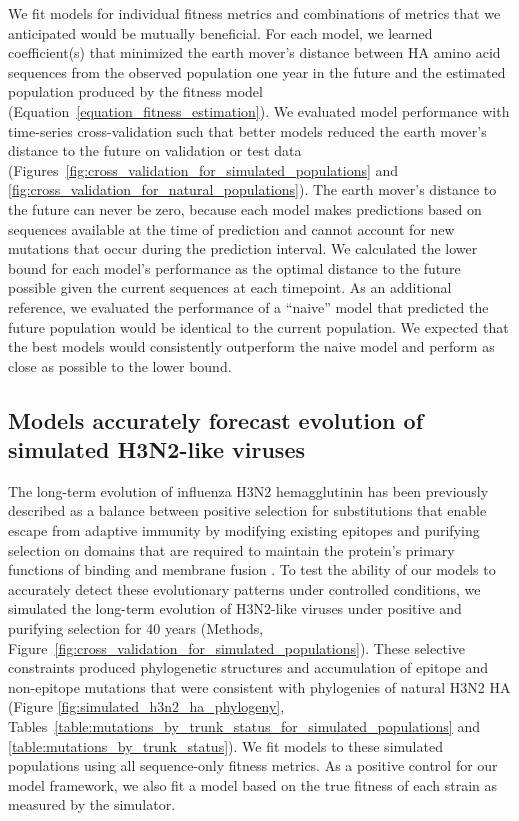 We fit models for individual fitness metrics and combinations of metrics that we anticipated would be mutually beneficial.
For each model, we learned coefficient(s) that minimized the earth mover's distance between HA amino acid sequences from the observed population one year in the future and the estimated population produced by the fitness model (Equation~\ref{equation_fitness_estimation}).
We evaluated model performance with time-series cross-validation such that better models reduced the earth mover's distance to the future on validation or test data (Figures~\ref{fig:cross_validation_for_simulated_populations} and \ref{fig:cross_validation_for_natural_populations}).
The earth mover's distance to the future can never be zero, because each model makes predictions based on sequences available at the time of prediction and cannot account for new mutations that occur during the prediction interval.
We calculated the lower bound for each model's performance as the optimal distance to the future possible given the current sequences at each timepoint.
As an additional reference, we evaluated the performance of a ``naive'' model that predicted the future population would be identical to the current population.
We expected that the best models would consistently outperform the naive model and perform as close as possible to the lower bound.

\subsection*{Models accurately forecast evolution of simulated H3N2-like viruses}

The long-term evolution of influenza H3N2 hemagglutinin has been previously described as a balance between positive selection for substitutions that enable escape from adaptive immunity by modifying existing epitopes and purifying selection on domains that are required to maintain the protein's primary functions of binding and membrane fusion \citep{Bush:1999vj,Neher2013,Luksza:2014hj,Koelle:2015dh}.
To test the ability of our models to accurately detect these evolutionary patterns under controlled conditions, we simulated the long-term evolution of H3N2-like viruses under positive and purifying selection for 40 years (Methods, Figure~\ref{fig:cross_validation_for_simulated_populations}).
These selective constraints produced phylogenetic structures and accumulation of epitope and non-epitope mutations that were consistent with phylogenies of natural H3N2 HA (Figure \ref{fig:simulated_h3n2_ha_phylogeny}, Tables~\ref{table:mutations_by_trunk_status_for_simulated_populations} and \ref{table:mutations_by_trunk_status}).
We fit models to these simulated populations using all sequence-only fitness metrics.
As a positive control for our model framework, we also fit a model based on the true fitness of each strain as measured by the simulator.

